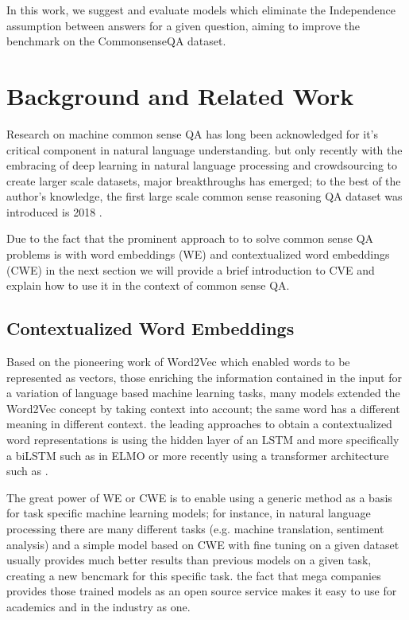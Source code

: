 \documentclass{article}
\begin{document}
In this work, we suggest and evaluate models which eliminate the Independence assumption between answers for a given question, aiming to improve the benchmark on the CommonsenseQA dataset. 

\section{Background and Related Work}
Research on machine common sense QA has long been acknowledged for it's critical component in natural language understanding. but only recently with the embracing of deep learning in natural language processing and crowdsourcing to create larger scale datasets, major breakthroughs has emerged; to the best of the author's knowledge, the first large scale common sense reasoning QA dataset was introduced is 2018 \cite{storks2019commonsense}.

Due to the fact that the prominent approach to to solve common sense QA problems is with word embeddings (WE) and contextualized word embeddings (CWE) in the next section we will provide a brief introduction to CVE and explain how to use it in the context of common sense QA.


\subsection{Contextualized Word Embeddings}
Based on the pioneering work of Word2Vec \cite{mikolov2013distributed} which enabled words to be represented as vectors, those
enriching the information contained in the input for a variation of language based machine learning tasks, many models extended the Word2Vec concept by taking context into account; the same word has a different meaning in different context. the leading approaches to obtain a contextualized word representations is using the hidden layer of an LSTM \cite{hochreiter1997long} and more specifically a biLSTM such as in ELMO \cite{peters2018deep} or more recently using a transformer architecture such as \cite{devlin2018bert,yang2019xlnet}.

The great power of WE or CWE is to enable using a generic method as a basis for task specific machine learning models; for instance, in natural language processing there are many different tasks (e.g. machine translation, sentiment analysis) and a simple model based on CWE with fine tuning on a given dataset usually provides much better results than previous models on a given task, creating a new bencmark for this specific task. the fact that mega companies provides those trained models as an open source service makes it easy to use for academics and in the industry as one.
\end{document}
